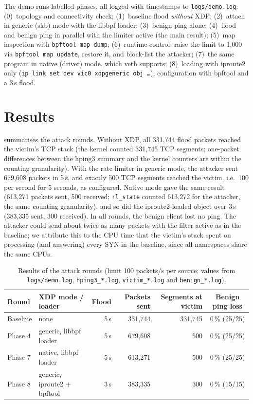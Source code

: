 The demo runs labelled phases, all logged with timestamps to \texttt{logs/demo.log}: (0)~topology and connectivity check; (1)~baseline flood \emph{without} XDP; (2)~attach in generic (skb) mode with the libbpf loader; (3)~benign ping alone; (4)~flood and benign ping in parallel with the limiter active (the main result); (5)~map inspection with \texttt{bpftool map dump}; (6)~runtime control: raise the limit to 1,000 via \texttt{bpftool map update}, restore it, and block-list the attacker; (7)~the same program in native (driver) mode, which veth supports; (8)~loading with iproute2 only (\texttt{ip link set dev vic0 xdpgeneric obj \dots}), configuration with bpftool and a 3\,s flood.

\section{Results}\label{sec:t4-results}
 summarises the attack rounds. Without XDP, all 331,744 flood packets reached the victim's TCP stack (the kernel counted 331,745 TCP segments; one-packet differences between the hping3 summary and the kernel counters are within the counting granularity). With the rate limiter in generic mode, the attacker sent 679,608 packets in 5\,s, and exactly 500 TCP segments reached the victim, i.e.\ 100 per second for 5 seconds, as configured. Native mode gave the same result (613,271 packets sent, 500 received; \texttt{rl\_state} counted 613,272 for the attacker, the same counting granularity), and so did the iproute2-loaded object over 3\,s (383,335 sent, 300 received). In all rounds, the benign client lost no ping. The attacker could send about twice as many packets with the filter active as in the baseline; we attribute this to the CPU time that the victim's stack spent on processing (and answering) every SYN in the baseline, since all namespaces share the same CPUs.

\begin{table}[htbp]
	\centering\small
	\caption{Results of the attack rounds (limit 100 packets/s per source; values from \texttt{logs/demo.log}, \texttt{hping3\_*.log}, \texttt{victim\_*.log} and \texttt{benign\_*.log}).}\label{tab:t4-results}
	\begin{tabular}{llrrrc}
		\toprule
		Round & XDP mode / loader & Flood & Packets sent & Segments at victim & Benign ping loss \\
		\midrule
		Baseline & none & 5\,s & 331,744 & 331,745 & 0\,\% (25/25) \\
		Phase 4 & generic, libbpf loader & 5\,s & 679,608 & 500 & 0\,\% (25/25) \\
		Phase 7 & native, libbpf loader & 5\,s & 613,271 & 500 & 0\,\% (25/25) \\
		Phase 8 & generic, iproute2 + bpftool & 3\,s & 383,335 & 300 & 0\,\% (15/15) \\
		\bottomrule
	\end{tabular}
\end{table}

